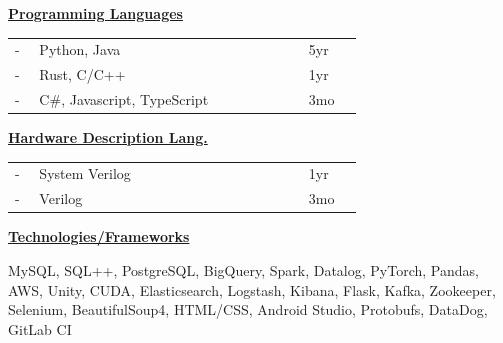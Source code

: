\documentclass{WeiAndrew}
\begin{document}
\setlength{\topskip}{0pt}
\noindent{}%
{%
    \hspace{0.02\textwidth}
    \begin{minipage}[t][\textheight-2\fboxsep-2\fboxrule][t]{0.25\textwidth}
        \color{white}
        \vspace{12px}
        \vspace{12px}
        \vspace{12px}

        \begin{itemize}[align=center]
        \end{itemize}
        \vspace{12px}

        \textbf{\underline{Programming Languages}}
        \begin{tabular}{p{0.04\linewidth}>{\raggedright}p{0.55\linewidth}p{0.1\linewidth}}
            - & Python, Java                & 5yr \\
            - & Rust, C/C++                 & 1yr \\
            - & C\#, Javascript, TypeScript & 3mo \\
        \end{tabular}
        \vspace{12px}

        \noindent\textbf{\underline{Hardware Description Lang.}}
        \begin{tabular}{p{0.04\linewidth}>{\raggedright}p{0.55\linewidth}p{0.1\linewidth}}
            - & System Verilog & 1yr \\
            - & Verilog        & 3mo \\
        \end{tabular}
        \vspace{12px}

        \textbf{\underline{Technologies/Frameworks}}
        \raggedright MySQL, SQL++, PostgreSQL, BigQuery,
        Spark, Datalog, PyTorch,
        Pandas, AWS, Unity, CUDA,
        Elasticsearch, Logstash,
        Kibana, Flask, Kafka,
        Zookeeper, Selenium,
        BeautifulSoup4, HTML/CSS,
        Android Studio, Protobufs,
        DataDog, GitLab CI
        \vspace{12px}


\end{minipage}}
\end{document}
